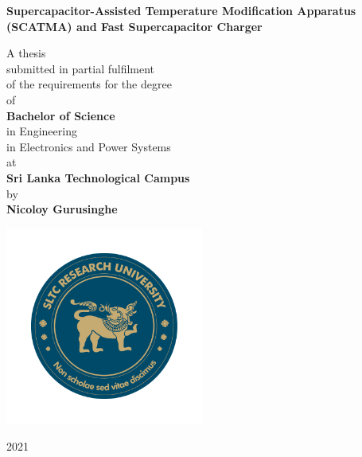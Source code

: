 \begin{titlepage}
\begin{center}

\vspace*{1cm}

\textsf{\Huge\bfseries{%
Supercapacitor-Assisted Temperature
Modification Apparatus (SCATMA)
and
Fast Supercapacitor Charger\\
}}

\vfill

\textsf{\large%
	A thesis \\[1ex]
	submitted in partial fulfilment\\[1ex]
	of the requirements for the degree\\[1ex]
	of\\[1ex]
\textbf{\Large Bachelor of Science}\\[1ex]
	in Engineering \\[1ex]
	in Electronics and Power Systems \\[1ex]
		at\\[1ex]
		\textbf{\Large Sri Lanka Technological Campus}\\[1ex]
	by  \\[2ex]
}
\textsf{\LARGE\bfseries{Nicoloy Gurusinghe}}\\

\vfill

\includegraphics[height=6.5cm]{_figs/SLTC LOGO.png}

 2021\\
\end{center}
\end{titlepage}

\clearemptydoublepage
\newpage

